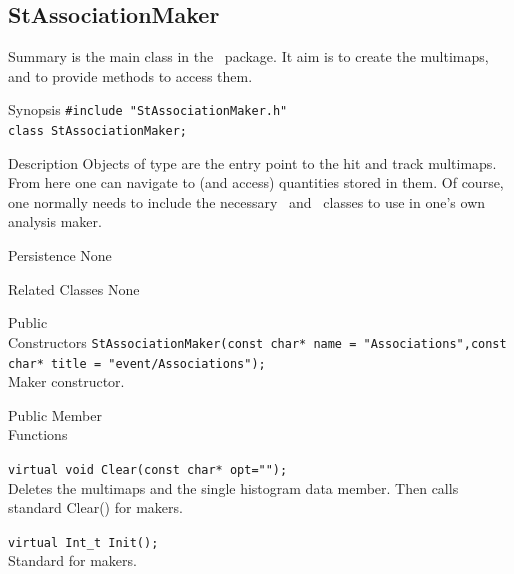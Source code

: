 \clearpage


%
%
\subsection{StAssociationMaker}
\label{sec:StAssociationMaker}
\begin{Entry}
\item[Summary]
     is the main class in the \StAssociationMaker\ package.
    It aim is to create the multimaps, and to provide methods to access them. 

\item[Synopsis]
    \verb+#include "StAssociationMaker.h"+\\
    \verb+class StAssociationMaker;+\\

\item[Description]
    Objects of type  are the entry point to the hit
    and track multimaps.
    From here one can navigate to (and access) quantities stored
    in them.  Of course, one normally needs to include the necessary
    \StEvent\ and \StMcEvent\ classes to use in one's own analysis maker.

\item[Persistence]
    None

\item[Related Classes]
    None

\item[Public\\ Constructors]
    \verb+StAssociationMaker(const char* name = "Associations",const char* title = "event/Associations");+\\
		       
    Maker constructor.

\item[Public Member\\ Functions]
    

    \verb+virtual void Clear(const char* opt="");+\\
    Deletes the multimaps and the single histogram data member.  Then calls standard Clear() for makers. 

    \verb+virtual Int_t Init();+\\
    Standard for makers. 


\end{Entry}
